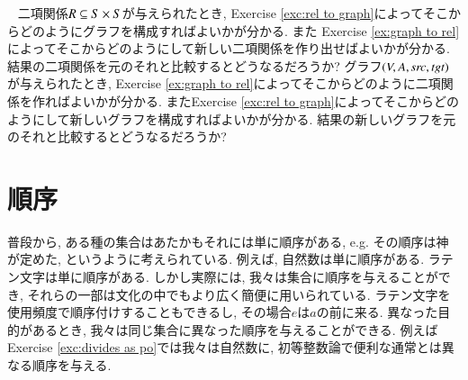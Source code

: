 \begin{exercise}~
\sexc 二項関係$R\ss S\times S$が与えられたとき, Exercise \ref{exc:rel to graph}によってそこからどのようにグラフを構成すればよいかが分かる. また Exercise \ref{ex:graph to rel}によってそこからどのようにして新しい二項関係を作り出せばよいかが分かる. 結果の二項関係を元のそれと比較するとどうなるだろうか?
\next グラフ$(V,A,\src,\tgt)$が与えられたとき, Exercise \ref{ex:graph to rel}によってそこからどのように二項関係を作ればよいかが分かる. またExercise \ref{exc:rel to graph}によってそこからどのようにして新しいグラフを構成すればよいかが分かる. 結果の新しいグラフを元のそれと比較するとどうなるだろうか?
\endsexc
\end{exercise}



\section{順序}\label{sec:orders}


普段から, ある種の集合はあたかもそれには単に順序がある, e.g. その順序は神が定めた, というように考えられている. 例えば, 自然数は単に順序がある. ラテン文字は単に順序がある. しかし実際には, 我々は集合に順序を与えることができ, それらの一部は文化の中でもより広く簡便に用いられている. ラテン文字を使用頻度で順序付けすることもできるし, その場合$e$は$a$の前に来る. 異なった目的があるとき, 我々は同じ集合に異なった順序を与えることができる. 例えばExercise \ref{exc:divides as po}では我々は自然数に, 初等整数論で便利な通常とは異なる順序を与える.

